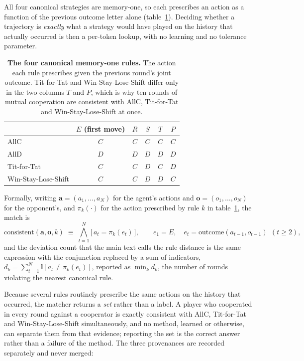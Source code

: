 \documentclass[openacc]{rsproca_new}
\begin{document}
All four canonical strategies are memory-one, so each prescribes an action as a
function of the previous outcome letter alone (table~\ref{tab:A-rules}).
Deciding whether a trajectory is \emph{exactly} what a strategy would have
played on the history that actually occurred is then a per-token lookup, with
no learning and no tolerance parameter.

\begin{table}[htbp]
\centering
\footnotesize
\caption{\textbf{The four canonical memory-one rules.} The action each rule
prescribes given the previous round's joint outcome. Tit-for-Tat and
Win-Stay-Lose-Shift differ only in the two columns $T$ and $P$, which is why
ten rounds of mutual cooperation are consistent with AllC, Tit-for-Tat and
Win-Stay-Lose-Shift at once.}
\label{tab:A-rules}
\begin{tabular}{@{}lccccc@{}}
\toprule
& $E$ (first move) & $R$ & $S$ & $T$ & $P$ \\
\midrule
AllC & $C$ & $C$ & $C$ & $C$ & $C$ \\
AllD & $D$ & $D$ & $D$ & $D$ & $D$ \\
Tit-for-Tat & $C$ & $C$ & $D$ & $C$ & $D$ \\
Win-Stay-Lose-Shift & $C$ & $C$ & $D$ & $D$ & $C$ \\
\bottomrule
\end{tabular}
\end{table}

Formally, writing $\mathbf{a} = (a_1, \ldots, a_N)$ for the agent's actions and
$\mathbf{o} = (o_1, \ldots, o_N)$ for the opponent's, and $\pi_k(\cdot)$ for the
action prescribed by rule $k$ in table~\ref{tab:A-rules}, the match is
\[
  \text{consistent}(\mathbf{a}, \mathbf{o}, k)
  \;\equiv\;
  \bigwedge_{t=1}^{N} \bigl[\, a_t = \pi_k(e_t) \,\bigr],
  \qquad
  e_1 = E, \quad
  e_t = \mathrm{outcome}(a_{t-1}, o_{t-1}) \ \ (t \geq 2),
\]
and the deviation count that the main text calls the rule distance is the same
expression with the conjunction replaced by a sum of indicators,
$d_k = \sum_{t=1}^{N} \mathbb{I}[a_t \neq \pi_k(e_t)]$, reported as
$\min_k d_k$, the number of rounds violating the nearest canonical rule.

Because several rules routinely prescribe the same actions on the history that
occurred, the matcher returns a \emph{set} rather than a label. A player who
cooperated in every round against a cooperator is exactly consistent with AllC,
Tit-for-Tat and Win-Stay-Lose-Shift simultaneously, and no method, learned or
otherwise, can separate them from that evidence; reporting the set is the
correct answer rather than a failure of the method. The three provenances are
recorded separately and never merged:
\end{document}
